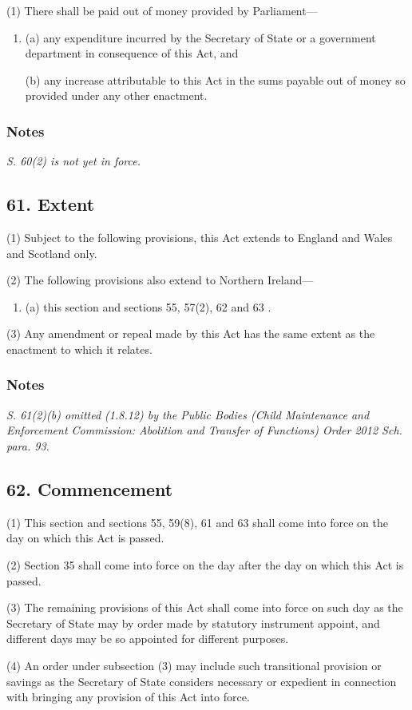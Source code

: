 \documentclass[a4paper]{article}
\newcommand\amendment[1]{\subsubsection*{Notes}{\itshape\frenchspacing\footnotesize #1 \par}}
\begin{document}
(1) There shall be paid out of money provided by Parliament—
\begin{enumerate}\item[]
(a) any expenditure incurred by the Secretary of State or a government department in consequence of this Act, and

(b) any increase attributable to this Act in the sums payable out of money so provided under any other enactment.
\end{enumerate}

\amendment{
S. 60(2) is not yet in force.
}

\subsection{61. Extent}

(1) Subject to the following provisions, this Act extends to England and Wales and Scotland only.

(2) The following provisions also extend to Northern Ireland---
\begin{enumerate}\item[]
(a) this section and sections 55, 57(2), 62 and 63%
%
.
\end{enumerate}

(3) Any amendment or repeal made by this Act has the same extent as the enactment to which it relates.

\amendment{
S. 61(2)(b) omitted (1.8.12) by the Public Bodies (Child Maintenance and Enforcement Commission: Abolition and Transfer of Functions) Order 2012 Sch. para. 93.
}

\subsection{62. Commencement}

(1) This section and sections 55, 59(8), 61 and 63 shall come into force on the day on which this Act is passed.

(2) Section 35 shall come into force on the day after the day on which this Act is passed.

(3) The remaining provisions of this Act shall come into force on such day as the Secretary of State may by order made by statutory instrument appoint, and different days may be so appointed for different purposes.

(4) An order under subsection (3) may include such transitional provision or savings as the Secretary of State considers necessary or expedient in connection with bringing any provision of this Act into force.
\end{document}
